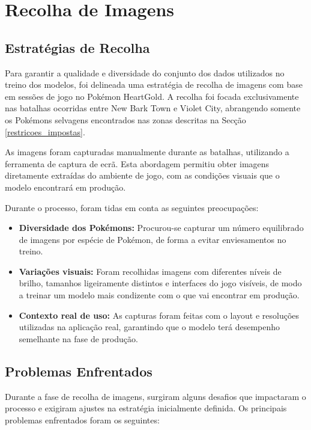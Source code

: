 \section{Recolha de Imagens} \label{recolha_imagens}
\subsection{Estratégias de Recolha}
Para garantir a qualidade e diversidade do conjunto dos dados utilizados no treino dos modelos, foi delineada uma estratégia de recolha de imagens com base em sessões de jogo no Pokémon HeartGold. A recolha foi focada exclusivamente nas batalhas ocorridas entre New Bark Town e Violet City, abrangendo somente os Pokémons selvagens encontrados nas zonas descritas na Secção \ref{restricoes_impostas}.

As imagens foram capturadas manualmente durante as batalhas, utilizando a ferramenta de captura de ecrã. Esta abordagem permitiu obter imagens diretamente extraídas do ambiente de jogo, com as condições visuais que o modelo encontrará em produção.

Durante o processo, foram tidas em conta as seguintes preocupações:

\begin{itemize} 
    \item \textbf{Diversidade dos Pokémons:} Procurou-se capturar um número equilibrado de imagens por espécie de Pokémon, de forma a evitar enviesamentos no treino.
    
    \item \textbf{Variações visuais:} Foram recolhidas imagens com diferentes níveis de brilho, tamanhos ligeiramente distintos e interfaces do jogo visíveis, de modo a treinar um modelo mais condizente com o que vai encontrar em produção.

    \item \textbf{Contexto real de uso:} As capturas foram feitas com o layout e resoluções utilizadas na aplicação real, garantindo que o modelo terá desempenho semelhante na fase de produção.
\end{itemize}

\subsection{Problemas Enfrentados}
Durante a fase de recolha de imagens, surgiram alguns desafios que impactaram o processo e exigiram ajustes na estratégia inicialmente definida. Os principais problemas enfrentados foram os seguintes:


